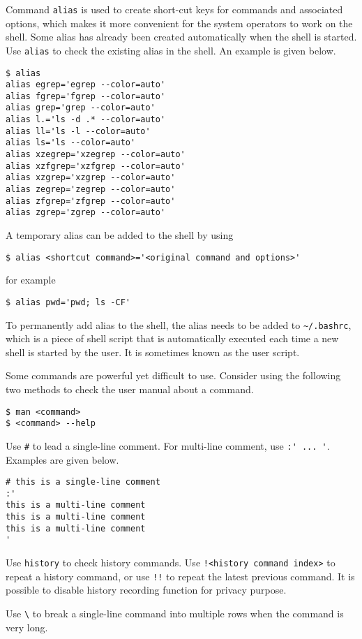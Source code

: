 Command \verb|alias| is used to create short-cut keys for commands and associated options, which makes it more convenient for the system operators to work on the shell. Some alias has already been created automatically when the shell is started. Use \verb|alias| to check the existing alias in the shell. An example is given below.

\begin{lstlisting}
$ alias
alias egrep='egrep --color=auto'
alias fgrep='fgrep --color=auto'
alias grep='grep --color=auto'
alias l.='ls -d .* --color=auto'
alias ll='ls -l --color=auto'
alias ls='ls --color=auto'
alias xzegrep='xzegrep --color=auto'
alias xzfgrep='xzfgrep --color=auto'
alias xzgrep='xzgrep --color=auto'
alias zegrep='zegrep --color=auto'
alias zfgrep='zfgrep --color=auto'
alias zgrep='zgrep --color=auto'
\end{lstlisting}
A temporary alias can be added to the shell by using
\begin{lstlisting}
$ alias <shortcut command>='<original command and options>'
\end{lstlisting}
for example
\begin{lstlisting}
$ alias pwd='pwd; ls -CF'
\end{lstlisting}
To permanently add alias to the shell, the alias needs to be added to \verb|~/.bashrc|, which is a piece of shell script that is automatically executed each time a new shell is started by the user. It is sometimes known as the user script.

Some commands are powerful yet difficult to use. Consider using the following two methods to check the user manual about a command.
\begin{lstlisting}
$ man <command>
$ <command> --help
\end{lstlisting}

Use \verb|#| to lead a single-line comment. For multi-line comment, use \verb|:' ... '|. Examples are given below.
\begin{lstlisting}
# this is a single-line comment
:'
this is a multi-line comment
this is a multi-line comment
this is a multi-line comment
'
\end{lstlisting}

Use \verb|history| to check history commands. Use \verb|!<history command index>| to repeat a history command, or use \verb|!!| to repeat the latest previous command. It is possible to disable history recording function for privacy purpose.

Use \verb|\| to break a single-line command into multiple rows when the command is very long.

